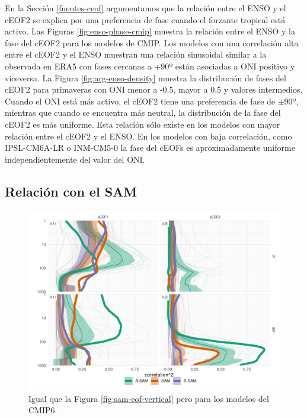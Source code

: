 \documentclass[12pt,oneside]{reedthesis}
\begin{document}
En la Sección \ref{fuentes-ceof} argumentamos que la relación entre el ENSO y el cEOF2 se explica por una preferencia de fase cuando el forzante tropical está activo.
Las Figuras \ref{fig:enso-phase-cmip} muestra la relación entre el ENSO y la fase del cEOF2 para los modelos de CMIP.
Los modelos con una correlación alta entre el cEOF2 y el ENSO muestran una relación sinusoidal similar a la observada en ERA5 con fases cercanas a +90º están asociadas a ONI positivo y viceversa.
La Figura \ref{fig:arg-enso-density} muestra la distribución de fases del cEOF2 para primaveras con ONI menor a -0.5, mayor a 0.5 y valores intermedios.
Cuando el ONI está más activo, el cEOF2 tiene una preferencia de fase de \(\pm90º\), mientras que cuando se encuentra más neutral, la distribución de la fase del cEOF2 es más uniforme.
Esta relación sólo existe en los modelos con mayor relación entre el cEOF2 y el ENSO.
En los modelos con baja correlación, como IPSL-CM6A-LR o INM-CM5-0 la fase del cEOFs es aproximadamente uniforme independientemente del valor del ONI.

\hypertarget{relaciuxf3n-con-el-sam}{%
\subsection{Relación con el SAM}\label{relaciuxf3n-con-el-sam}}

\begin{figure}
\includegraphics{figures/50-cmip6/cor-sam-cmip6-1} \caption{Igual que la Figura \ref{fig:sam-eof-vertical} pero para los modelos del CMIP6.}\label{fig:cor-sam-cmip6}
\end{figure}
\end{document}
